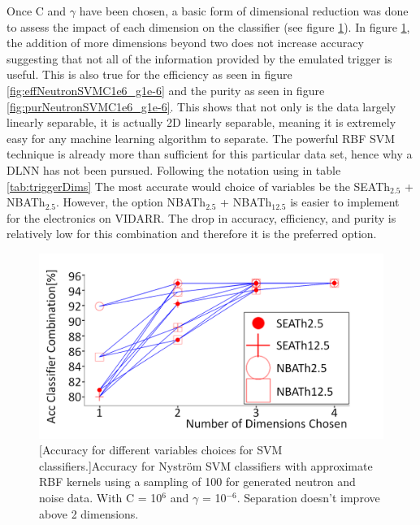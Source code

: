 Once C and $\gamma$ have been chosen, a basic form of dimensional reduction was done to assess the impact of each dimension on the classifier (see figure \ref{fig:accNeutronSVMC1e6_g1e-6}). In figure \ref{fig:accNeutronSVMC1e6_g1e-6}, the addition of more dimensions beyond two does not increase accuracy suggesting that not all of the information provided by the emulated trigger is useful. This is also true for the efficiency as seen in figure \ref{fig:effNeutronSVMC1e6_g1e-6} and the purity as seen in figure \ref{fig:purNeutronSVMC1e6_g1e-6}. This shows that not only is the data largely linearly separable, it is actually 2D linearly separable, meaning it is extremely easy for any machine learning algorithm to separate. The powerful RBF SVM technique is already more than sufficient for this particular data set, hence why a DLNN has not been pursued. Following the notation using in table \ref{tab:triggerDims} The most accurate would choice of variables be the SEATh$_{2.5}$ + NBATh$_{2.5}$. However, the option NBATh$_{2.5}$ + NBATh$_{12.5}$ is easier to implement for the electronics on VIDARR. The drop in accuracy, efficiency, and purity is relatively low for this combination and therefore it is the preferred option. 

\begin{figure}[!h]
\centering
\includegraphics[width=0.8\linewidth]{Chapter4/Figs/Raster/accNeutronSVMC1e6_g1e-6MedText.png}
[Accuracy for different variables choices for SVM classifiers.]{Accuracy for Nyström SVM classifiers with approximate RBF kernels using a sampling of 100 for generated neutron and noise data. With C = 10$^6$ and $\gamma$ = 10$^{-6}$. Separation doesn't improve above 2 dimensions.} 
\label{fig:accNeutronSVMC1e6_g1e-6}
\end{figure}

